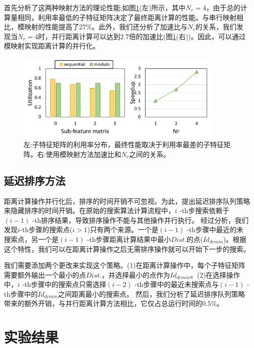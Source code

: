 首先分析了这两种映射方法的理论性能;如图\ref{fig:parallel-dist}(左)所示，其中$N_r=4$，由于总的计算量相同，利用率最低的子特征矩阵决定了最终距离计算的性能。与串行映射相比，模映射的性能提高了27\%。此外，我们还分析了加速比与$N_r$的关系，我们发现当$N_r=4$时，并行距离计算可以达到2.7倍的加速比(图\ref{fig:parallel-dist}(右))。因此，可以通过模映射实现距离计算的并行化。

\begin{figure}
  \centering
  \includegraphics[width=0.9\textwidth]{figures/context-2/parallel-dist.pdf}
  \caption{左:子特征矩阵的利用率分布，最终性能取决于利用率最差的子特征矩阵。右:使用模映射方法加速比和$N_r$之间的关系。}
  \label{fig:parallel-dist}
\end{figure}

\subsection{延迟排序方法}\label{sec:nmp-method-sort}
距离计算操作并行化后，排序的时间开销不可忽视。为此，提出延迟排序队列策略来隐藏排序的时间开销。在原始的搜索算法计算流程中，$i$ -th步搜索依赖于$(i-1)$ -th排序结果，导致排序操作不能与其他操作并行执行。
经过分析，我们发现$i$-th步骤的搜索点($i>1$)只有两个来源。一个是$(i-1)$ -th步骤中最近的未搜索点，另一个是$(i-1)$ -th步骤距离计算结果中最小$Dist.$的点($Id_{dcmin}$)。根据这个特性，我们可以在距离计算操作之后无需排序操作就可以开始下一步的搜索。

我们需要添加两个更改来实现这个策略。(1)在距离计算操作中，每个子特征矩阵需要额外输出一个最小的点$Dist.$，并选择最小的点作为$Id_{dcmin}$。(2)在选择操作中，$i$ -th步骤中的搜索点只需选择$(i-2)$ -th步骤中的最近未搜索点与$(i-1)$ -th步骤中的$Id_{dcmin}$之间距离最小的搜索点。
然后，我们分析了延迟排序队列策略带来的额外开销，与并行距离计算方法相比，它仅占总运行时间的0.5\%。




\section{实验结果}\label{sec:nmp-experiment}
